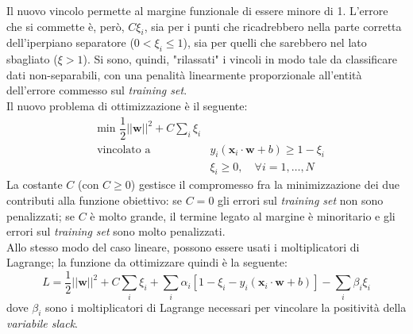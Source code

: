 Il nuovo vincolo permette al margine funzionale di essere minore di 1. L'errore che si commette è, però, $C\xi_i$, sia per i punti che ricadrebbero nella parte corretta dell'iperpiano separatore ($0<\xi_i\leq1$), sia per quelli che sarebbero nel lato sbagliato ($\xi>1$).
Si sono, quindi, "rilassati" i vincoli in modo tale da classificare dati non-separabili, con una penalità linearmente proporzionale all'entità dell'errore commesso sul \emph{training set}.\\

Il nuovo problema di ottimizzazione è il seguente:
\begin{eqnarray}
\label{eq:ottimizzazione_softmargin}
&\text{min }\dfrac{1}{2}\vert\vert\mathbf{w}\vert\vert^2+C\sum_i\xi_i\\
&\text{vincolato a }&y_i\left (\mathbf{x}_i\cdot\mathbf{w}+b \right )\geq1-\xi_i\\
&& \xi_i\geq0, \quad \forall i=1,\ldots,N
\end{eqnarray}
La costante $C$ (con $C\geq0$) gestisce il compromesso fra la minimizzazione dei due contributi alla funzione obiettivo: se $C=0$ gli errori sul \emph{training set} non sono penalizzati; se $C$ è molto grande, il termine legato al margine è minoritario e gli errori sul \emph{training set} sono molto penalizzati.
\\
Allo stesso modo del caso lineare, possono essere usati i moltiplicatori di Lagrange; la funzione da ottimizzare quindi è la seguente:
\begin{equation}
\label{eq:lagrangiana_sofmargin}
L=\dfrac{1}{2}\vert\vert\mathbf{w}\vert\vert^2+C\sum_i\xi_i+\sum_i\alpha_i\left [1-\xi_i-y_i\left (\mathbf{x}_i\cdot\mathbf{w}+b \right )\right ]-\sum_i\beta_i\xi_i
\end{equation}
dove $\beta_i$ sono i moltiplicatori di Lagrange necessari per vincolare la positività della \emph{variabile slack}.	
\\

